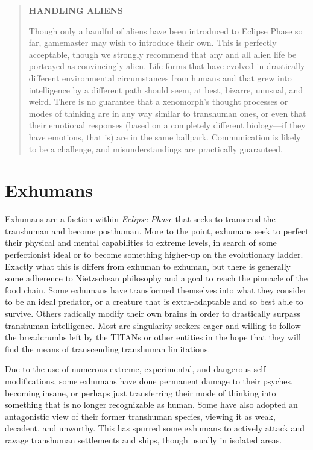 \begin{quotation}
\begin{large}
\textbf{HANDLING ALIENS}
\end{large}

Though only a handful of aliens have been introduced
to Eclipse Phase so far, gamemaster may
wish to introduce their own. This is perfectly
acceptable, though we strongly recommend
that any and all alien life be portrayed as convincingly
alien. Life forms that have evolved in
drastically different environmental circumstances
from humans and that grew into intelligence by
a different path should seem, at best, bizarre,
unusual, and weird. There is no guarantee that
a xenomorph’s thought processes or modes of
thinking are in any way similar to transhuman
ones, or even that their emotional responses
(based on a completely different biology—if they
have emotions, that is) are in the same ballpark.
Communication is likely to be a challenge, and
misunderstandings are practically guaranteed.
\end{quotation}


\section{Exhumans }

Exhumans are a faction within \textit{Eclipse Phase} that 
seeks to transcend the transhuman and become 
posthuman. More to the point, exhumans seek to 
perfect their physical and mental capabilities to extreme
levels, in search of some perfectionist ideal or
to become something higher-up on the evolutionary 
ladder. Exactly what this is differs from exhuman to 
exhuman, but there is generally some adherence to 
Nietzschean philosophy and a goal to reach the pinnacle
of the food chain. Some exhumans have transformed
themselves into what they consider to be an
ideal predator, or a creature that is extra-adaptable 
and so best able to survive. Others radically modify 
their own brains in order to drastically surpass 
transhuman intelligence. Most are singularity seekers
eager and willing to follow the breadcrumbs
left by the TITANs or other entities in the hope that 
they will find the means of transcending transhuman
limitations.

Due to the use of numerous extreme, experimental, 
and dangerous self-modifications, some exhumans 
have done permanent damage to their psyches, 
becoming insane, or perhaps just transferring their 
mode of thinking into something that is no longer 
recognizable as human. Some have also adopted an 
antagonistic view of their former transhuman species, 
viewing it as weak, decadent, and unworthy. This 
has spurred some exhumans to actively attack and 
ravage transhuman settlements and ships, though 
usually in isolated areas.

